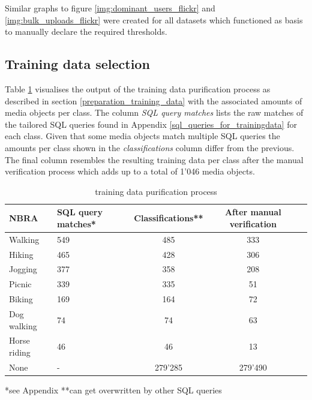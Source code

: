 Similar graphs to figure \ref{img:dominant_users_flickr} and \ref{img:bulk_uploads_flickr} were created for all datasets which functioned as basis to manually declare the required thresholds.

\subsection{Training data selection}
Table \ref{tab:trainingsdata} visualises the output of the training data purification process as described in section \ref{preparation_training_data} with the associated amounts of media objects per class. The column \textit{SQL query matches} lists the raw matches of the tailored SQL queries found in Appendix \ref{sql_queries_for_trainingdata} for each class. Given that some media objects match multiple SQL queries the amounts per class shown in the \textit{classifications} column differ from the previous. The final column resembles the resulting training data per class after the manual verification process which adds up to a total of 1'046 media objects. 

\begin{table}[ht]
\begin{center}
\caption{training data purification process}\vspace{1ex}
\label{tab:trainingsdata}
\begin{tabular}{llccc}\hline
NBRA & SQL query matches* & Classifications** & After manual verification \\ \hline
Walking & 549 & 485 & 333 \\
Hiking & 465 & 428 & 306 \\
Jogging & 377 & 358 & 208 \\
Picnic & 339 & 335 & 51 \\
Biking & 169 & 164 & 72 \\
Dog walking & 74 & 74 & 63 \\
Horse riding & 46 & 46 & 13 \\
None & - & 279'285 & 279'490 \\ \hline
\end{tabular}
\newline
*see Appendix **can get overwritten by other SQL queries
\end{center}
\end{table}

